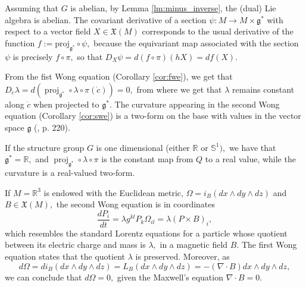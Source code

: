 \documentclass[12pt, letterpaper, reqno]{amsart}
\theoremstyle{definition}
\theoremstyle{plain}
\theoremstyle{remark}
\begin{document}
Assuming that $ G$ is abelian, by Lemma \ref{lm:minus_inverse}, the (dual) Lie algebra is abelian. The covariant derivative  of a section $ \psi: M \rightarrow M\times \mathfrak{g}^{*} $ with respect to a vector field $ X\in \mathfrak{X}(M) $ corresponds to the usual derivative of the function $f:= \operatorname{proj_{ \mathfrak{g}^*}}\circ \psi,$ because the equivariant map associated with the section $ \psi $ is precisely $ f\circ\pi, $ so that $ D_X\psi=d(f\circ\pi)(hX) = df(X). $ 

From the fist Wong equation (Corollary \ref{cor:fwe}), we get that $ D_{\dot{c}}\lambda = d( \operatorname{proj}_{ \mathfrak{g}^*}\circ \lambda\circ\pi(\dot{c}))=0, $ from where we get that $ \lambda $ remains constant along $ \dot{c} $ when projected to $ \mathfrak{g}^{*}. $ The curvature appearing in the second Wong equation (Corollary \ref{cor:swe}) is a two-form on the base with values in the vector space $ \mathfrak{g} $ (\cite{montgomery2002tour}, p. 220).

If the structure group $ G $ is one dimensional (either $ \mathbb{R} $ or $ \mathbb{S}^1), $ we have that $ \mathfrak{g}^*= \mathbb{R}, $ and $ \operatorname{proj}_{ \mathfrak{g}^*} \circ\lambda\circ\pi $ is the constant map from $ Q $ to a real value, while the curvature is a real-valued two-form.

If $ M = \mathbb{R}^3$ is endowed with the Euclidean metric, $ \Omega = i_B(dx\wedge dy\wedge dz) $ and $ B\in \mathfrak{X}(M), $ the second Wong equation is in coordinates 
$$ \frac{d P_i}{dt} = \lambda g^{kl} P_k \Omega_{il} = \lambda (P\times B)_i, $$ 
which resembles the standard Lorentz equations for a particle whose quotient between its electric charge and mass is $ \lambda, $ in a magnetic field $ B. $ The first Wong equation states that the quotient $\lambda$ is preserved. Moreover, as
\begin{dmath*}
	d\Omega = di_B(dx\wedge dy\wedge dz) = L_B(dx\wedge dy\wedge dz) = -(\nabla\cdot B) dx\wedge dy\wedge dz,	
\end{dmath*}
we can conclude that $ d\Omega=0, $ given the Maxwell's equation $ \nabla\cdot B=0. $ 
\newpage

\nocite{*}

\end{document}
